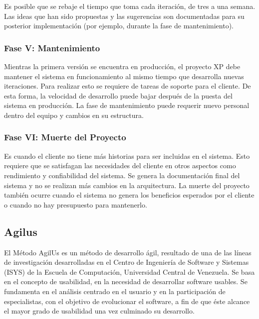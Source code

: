 	Es posible que se rebaje el tiempo que toma cada iteración, de tres a una semana. Las ideas que han sido propuestas y las sugerencias son documentadas para su posterior implementación (por ejemplo, durante la fase de mantenimiento).

\setlength{\parskip}{0mm}

\subsubsection{Fase V: Mantenimiento}
\setlength{\parskip}{5mm}

	Mientras la primera versión se encuentra en producción, el proyecto XP debe mantener el sistema en funcionamiento al mismo tiempo que desarrolla nuevas iteraciones. Para realizar esto se requiere de tareas de soporte para el cliente. De esta forma, la velocidad de desarrollo puede bajar después de la puesta del sistema en producción. La fase de mantenimiento puede requerir nuevo personal dentro del equipo y cambios en su estructura.

\setlength{\parskip}{0mm}

\subsubsection{Fase VI: Muerte del Proyecto}
\setlength{\parskip}{5mm}

	Es cuando el cliente no tiene más historias para ser incluidas en el sistema. Esto requiere que se satisfagan las necesidades del cliente en otros aspectos como rendimiento y confiabilidad del sistema. Se genera la documentación final del sistema y no se realizan más cambios en la arquitectura. La muerte del proyecto también ocurre cuando el sistema no genera los beneficios esperados por el cliente o cuando no hay presupuesto para mantenerlo.

\setlength{\parskip}{0mm}



\subsection{Agilus}
\setlength{\parskip}{5mm}

	El Método AgilUs es un método de desarrollo ágil, resultado de una de las líneas de investigación desarrolladas en el Centro de Ingeniería de Software y Sistemas (ISYS) de la Escuela de Computación, Universidad Central de Venezuela. Se basa en el concepto de usabilidad, en la necesidad de desarrollar software usables. Se fundamenta en el análisis centrado en el usuario y en la participación de especialistas, con el objetivo de evolucionar el software, a fin de que éste alcance el mayor grado de usabilidad una vez culminado su desarrollo.
	
